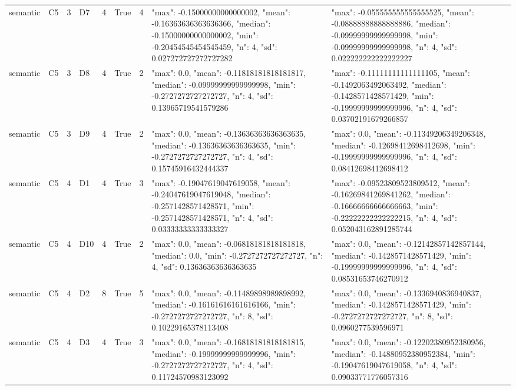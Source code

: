 \begin{tabular}{lllllllll}
semantic & C5 & 3 & D7 & 4 & True & 4 & {"max": -0.15000000000000002, "mean": -0.16363636363636366, "median": -0.15000000000000002, "min": -0.20454545454545459, "n": 4, "sd": 0.027272727272727282} & {"max": -0.055555555555555525, "mean": -0.08888888888888886, "median": -0.09999999999999998, "min": -0.09999999999999998, "n": 4, "sd": 0.022222222222222227} \\
semantic & C5 & 3 & D8 & 4 & True & 2 & {"max": 0.0, "mean": -0.11818181818181817, "median": -0.09999999999999998, "min": -0.2727272727272727, "n": 4, "sd": 0.13965719541579286} & {"max": -0.11111111111111105, "mean": -0.1492063492063492, "median": -0.1428571428571429, "min": -0.19999999999999996, "n": 4, "sd": 0.03702191679266857} \\
semantic & C5 & 3 & D9 & 4 & True & 2 & {"max": 0.0, "mean": -0.13636363636363635, "median": -0.13636363636363635, "min": -0.2727272727272727, "n": 4, "sd": 0.15745916432444337} & {"max": 0.0, "mean": -0.11349206349206348, "median": -0.12698412698412698, "min": -0.19999999999999996, "n": 4, "sd": 0.08412698412698412} \\
semantic & C5 & 4 & D1 & 4 & True & 3 & {"max": -0.19047619047619058, "mean": -0.24047619047619048, "median": -0.2571428571428571, "min": -0.2571428571428571, "n": 4, "sd": 0.03333333333333327} & {"max": -0.09523809523809512, "mean": -0.16269841269841262, "median": -0.16666666666666663, "min": -0.22222222222222215, "n": 4, "sd": 0.052043162891285744} \\
semantic & C5 & 4 & D10 & 4 & True & 2 & {"max": 0.0, "mean": -0.06818181818181818, "median": 0.0, "min": -0.2727272727272727, "n": 4, "sd": 0.13636363636363635} & {"max": 0.0, "mean": -0.12142857142857144, "median": -0.1428571428571429, "min": -0.19999999999999996, "n": 4, "sd": 0.08531653746270912} \\
semantic & C5 & 4 & D2 & 8 & True & 5 & {"max": 0.0, "mean": -0.11489898989898992, "median": -0.16161616161616166, "min": -0.2727272727272727, "n": 8, "sd": 0.10229165378113408} & {"max": 0.0, "mean": -0.1336940836940837, "median": -0.1428571428571429, "min": -0.2727272727272727, "n": 8, "sd": 0.0960277539596971} \\
semantic & C5 & 4 & D3 & 4 & True & 3 & {"max": 0.0, "mean": -0.16818181818181815, "median": -0.19999999999999996, "min": -0.2727272727272727, "n": 4, "sd": 0.11724570983123092} & {"max": 0.0, "mean": -0.12202380952380956, "median": -0.14880952380952384, "min": -0.19047619047619058, "n": 4, "sd": 0.09033771776057316} \\

\end{tabular}

